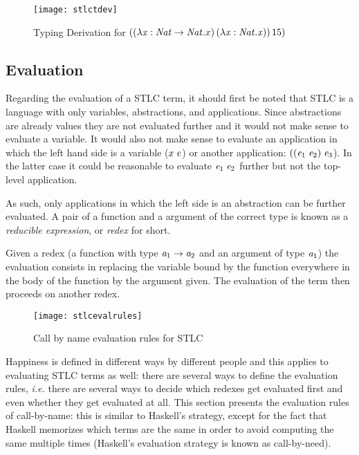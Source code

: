 \begin{figure}
  \centering
  \texttt{[image: stlctdev]}
  \caption[angle=90]{Typing Derivation for  $((\lambda \mathit{x}: \mathit{Nat} \rightarrow \mathit{Nat}.x) \, (\lambda \mathit{x}:\mathit{Nat}.\mathit{x}))\,15)$}
  \label{stlctydev}
\end{figure}

\subsection{Evaluation}
\label{stlceval}
Regarding the evaluation of a STLC term, it should first be noted that STLC is a language with only variables, abstractions, and applications. Since abstractions are already values they are not evaluated further and it would not make sense to evaluate a variable. It would also not make sense to evaluate an application in which the left hand side is a variable ($\mathit{x}\; \mathit{e}$) or another application: $((\mathit{e}_1\;\mathit{e}_2)\;\mathit{e}_3$). In the latter case it could be reasonable to evaluate $\mathit{e}_1\;\mathit{e}_2$ further but not the top-level application. 

As such, only applications in which the left side is an abstraction can be further evaluated. A pair of a function and a argument of the correct type is known as a \textit{reducible expression}, or \textit{redex} for short.

Given a redex (a function with type $\mathit{a}_1\to\mathit{a}_2$ and an argument of type $\mathit{a}_1$) the evaluation consists in replacing the variable bound by the function everywhere in the body of the function by the argument given. The evaluation of the term then proceeds on another redex.

\begin{figure}
  \centering
  \texttt{[image: stlcevalrules]}
  \caption{Call by name evaluation rules for STLC}
  \label{STLC eval}
\end{figure}

Happiness is defined in different ways by different people and this applies to evaluating STLC terms as well: there are several ways to define the evaluation rules, \textit{i.e.} there are several ways to decide which redexes get evaluated first and even whether they get evaluated at all. This section presents the evaluation rules of call-by-name: this is similar to Haskell's strategy, except for the fact that Haskell memorizes which terms are the same in order to avoid computing the same multiple times (Haskell's evaluation strategy is known as call-by-need).

